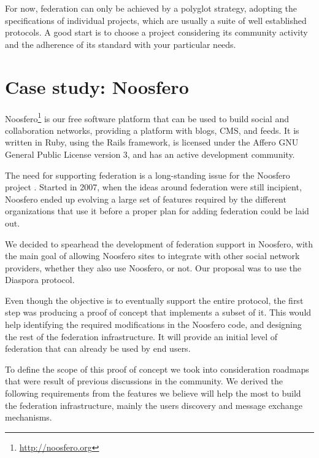 For now, federation can only be achieved by a polyglot strategy, adopting
the specifications of individual projects, which are usually a suite of
well established protocols. A good start is to choose a project
considering its community activity and the adherence of its standard
with your particular needs.

\section{Case study: Noosfero}

Noosfero\footnote{\url{http://noosfero.org}} is our free software
platform that can be used to build social and collaboration networks,
providing a platform with blogs, CMS, and feeds. It is written in Ruby,
using the Rails framework, is licensed under the Affero GNU General
Public License version 3, and has an active development community.

The need for supporting federation is a long-standing issue for the
Noosfero project \cite{federationNoosfero2017}. Started in 2007, when
the ideas around federation were still incipient, Noosfero ended up
evolving a large set of features required by the different organizations
that use it before a proper plan for adding federation could be laid out.

We decided to spearhead the development of federation support in
Noosfero, with the main goal of allowing Noosfero sites to integrate with
other social network providers, whether they also use Noosfero, or
not. Our proposal was to use the Diaspora protocol.

Even though the objective is to eventually support the entire protocol,
the first step was producing a proof of concept that implements a subset
of it. This would help identifying the required modifications in the
Noosfero code, and designing the rest of the federation infrastructure.
It will provide an initial level of federation that can already be
used by end users.

To define the scope of this proof of concept we took into consideration
roadmaps that were result of previous discussions in the community. We derived
the following requirements from the features we believe will help the most to
build the federation infrastructure, mainly the users discovery and message
exchange mechanisms.


